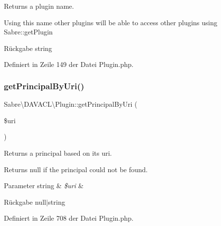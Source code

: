 Returns a plugin name.

Using this name other plugins will be able to access other plugins using Sabre\+::get\+Plugin

\begin{DoxyReturn}{Rückgabe}
string 
\end{DoxyReturn}


Definiert in Zeile 149 der Datei Plugin.\+php.

\mbox{\label{class_sabre_1_1_d_a_v_a_c_l_1_1_plugin_a835383eab7a795345e0a6df865a7aef5}} 
\subsubsection{\texorpdfstring{get\+Principal\+By\+Uri()}{getPrincipalByUri()}}
{\footnotesize\ttfamily Sabre\textbackslash{}\+D\+A\+V\+A\+C\+L\textbackslash{}\+Plugin\+::get\+Principal\+By\+Uri (\begin{DoxyParamCaption}\item[{}]{\$uri }\end{DoxyParamCaption})}

Returns a principal based on its uri.

Returns null if the principal could not be found.


\begin{DoxyParams}[1]{Parameter}
string & {\em \$uri} & \\
\hline
\end{DoxyParams}
\begin{DoxyReturn}{Rückgabe}
null$\vert$string 
\end{DoxyReturn}


Definiert in Zeile 708 der Datei Plugin.\+php.

\mbox{\label{class_sabre_1_1_d_a_v_a_c_l_1_1_plugin_a55048aaeec48afba2ae643c7f6ad9abf}} 
